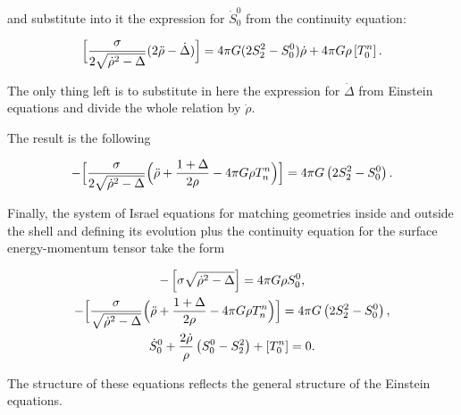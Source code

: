 and substitute into it the expression for $\dot S^0_0$ from the continuity equation:

\begin{equation}

\label{sdot}

\Bigl[\frac{\sigma}{2 \sqrt{\dot \rho^2 - \Delta}} (2 \ddot \rho - \dot \Delta ) \Bigr] =

4 \pi G (2 S^2_2 - S^0_0 ) \dot \rho + 4 \pi G \rho \left[T_0^n \right] .

\end{equation}

The only thing left is to substitute in here the expression for $\dot \Delta$ from Einstein equations and divide the whole relation by $\dot \rho$. 

The result is the following

\begin{equation}

\label{roddf}

- \Bigl[\frac{\sigma}{2 \sqrt{\dot \rho^2 - \Delta}} \Bigl(\ddot \rho + \frac{1 + \Delta}{2 \rho} -

4 \pi G \rho T^n_n \Bigr) \Bigr]

 = 4 \pi G \left(2 S^2_2 - S^0_0 \right) .

\end{equation}



Finally, the system of Israel equations for matching geometries inside and outside the shell and defining its evolution plus the continuity equation for the surface energy-momentum tensor take the form

\begin{gather}

\label{fullssys}

- \left[\sigma \sqrt{\dot \rho^2 - \Delta} \right] = 4 \pi G \rho S^0_0 , \\

- \Bigl[\frac{\sigma}{ \sqrt{\dot \rho^2 - \Delta}} \Bigl(\ddot \rho + \frac{1 + \Delta}{2 \rho} -

4 \pi G \rho T^n_n \Bigr) \Bigr] =4 \pi G \left(2 S^2_2 - S^0_0 \right) , \\

\dot S^0_0 + \frac{2 \dot \rho}{\rho} \left(S^0_0 - S^2_2 \right) + \left[T_0^n \right] = 0  .

\end{gather}

The structure of these equations reflects the general structure of the Einstein equations. 

